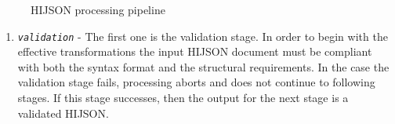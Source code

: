 \begin{figure}[!htbp]
\centering
{}
\caption{HIJSON processing pipeline}
\label{fig:pipeline}
\end{figure}

\begin{enumerate}
\def\labelenumi{\arabic{enumi}.}
\itemsep1pt\parskip0pt
\item
 \textit{\texttt{validation}} - The first one is the validation stage. In
  order to begin with the effective transformations the input HIJSON  document
  must be compliant with both the syntax format and the structural requirements.   In the
  case the validation stage fails, processing aborts and does not continue to
  following stages. If this stage successes, then the output for the next stage is a
  validated  HIJSON.


\end{enumerate}

